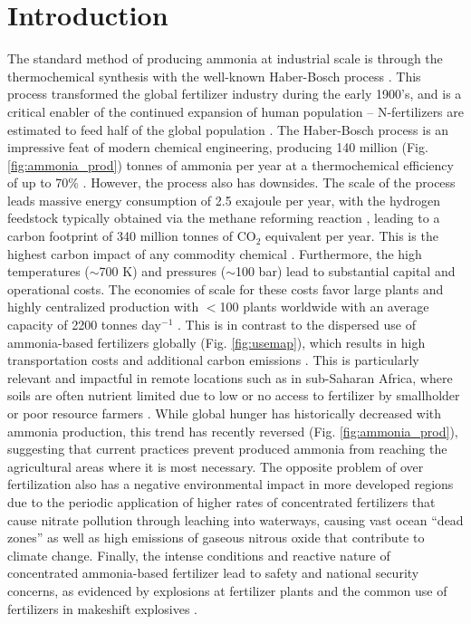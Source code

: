 \section{Introduction}

The standard method of producing ammonia at industrial scale is through the thermochemical synthesis with the well-known Haber-Bosch process \cite{Schloegl_2003}. This process transformed the global fertilizer industry during the early 1900's, and is a critical enabler of the continued expansion of human population \cite{Smil_1999} -- N-fertilizers are estimated to feed half of the global population \cite{Zhang_2015}. The Haber-Bosch process is an impressive feat of modern chemical engineering, producing 140 million (Fig. \ref{fig:ammonia_prod}) tonnes of ammonia per year at a thermochemical efficiency of up to 70\% \cite{Schloegl_2003,Schiffer_2017}. However, the process also has downsides. The scale of the process leads massive energy consumption of 2.5 exajoule per year, with the hydrogen feedstock typically obtained via the methane reforming reaction \cite{Abbas_2010}, leading to a carbon footprint of 340 million tonnes of CO$_2$ equivalent per year. This is the highest carbon impact of any commodity chemical \cite{Schiffer_2017}. Furthermore, the high temperatures ($\sim$700 K) and pressures ($\sim$100 bar) lead to substantial capital and operational costs. The economies of scale for these costs favor large plants and highly centralized production with $<$100 plants worldwide with an average capacity of 2200 tonnes day$^{-1}$ \cite{McArthur_2017, Bartels}. This is in contrast to the dispersed use of ammonia-based fertilizers globally (Fig. \ref{fig:usemap}), which results in high transportation costs and additional carbon emissions \cite{West_2002}. This is particularly relevant and impactful in remote locations such as in sub-Saharan Africa, where soils are often nutrient limited due to low or no access to fertilizer by smallholder or poor resource farmers \cite{Gilbert_2012, Mueller_2012, VanderVelde2014}. While global hunger has historically decreased with ammonia production, this trend has recently reversed (Fig. \ref{fig:ammonia_prod}), suggesting that current practices prevent produced ammonia from reaching the agricultural areas where it is most necessary. The opposite problem of over fertilization also has a negative environmental impact in more developed regions due to the periodic application of higher rates of concentrated fertilizers that cause nitrate pollution through leaching into waterways, causing vast ocean ``dead zones'' \cite{Diaz2008, Stevens_2019} as well as high emissions of gaseous nitrous oxide that contribute to climate change. Finally, the intense conditions and reactive nature of concentrated ammonia-based fertilizer lead to safety and national security concerns, as evidenced by explosions at fertilizer plants and the common use of fertilizers in makeshift explosives \cite{Marlair_2005}.

